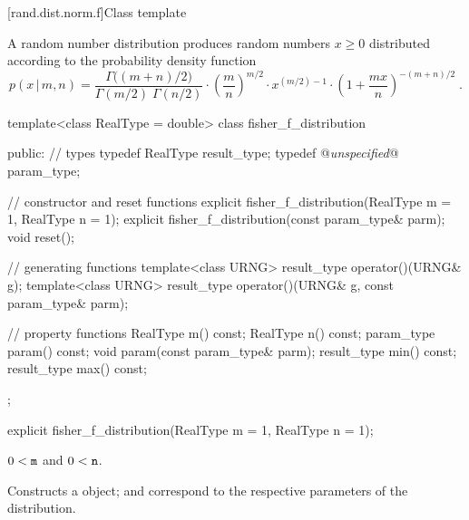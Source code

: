
[rand.dist.norm.f]{Class template }%
%

\pnum
A  random number distribution
produces random numbers $x\ge0$
distributed according to
the probability density function%
%
\[%
 p(x\,|\,m,n)
      = \frac{\Gamma\big((m+n)/2\big)}
             {\Gamma(m/2) \; \Gamma(n/2)}
        \cdot
        \left(\frac{m}{n}\right)^{m/2}
        \cdot
        x^{(m/2)-1}
        \cdot
        {\left( 1 + \frac{m x}{n}  \right)}^{-(m+n)/2}
\; \mbox{.}
\]

\begin{codeblock}
template<class RealType = double>
 class fisher_f_distribution
{
public:
 // types
 typedef RealType result_type;
 typedef @\textit{unspecified}@ param_type;

 // constructor and reset functions
 explicit fisher_f_distribution(RealType m = 1, RealType n = 1);
 explicit fisher_f_distribution(const param_type& parm);
 void reset();

 // generating functions
 template<class URNG>
   result_type operator()(URNG& g);
 template<class URNG>
   result_type operator()(URNG& g, const param_type& parm);

 // property functions
 RealType m() const;
 RealType n() const;
 param_type param() const;
 void param(const param_type& parm);
 result_type min() const;
 result_type max() const;
};
\end{codeblock}


%
\begin{itemdecl}
explicit fisher_f_distribution(RealType m = 1, RealType n = 1);
\end{itemdecl}

\begin{itemdescr}
\pnum\requires
 $ 0 < \texttt{m} $ and $ 0 < \texttt{n} $.

\pnum\effects Constructs a  object;
  and 
 correspond to the respective parameters of the distribution.
\end{itemdescr}

